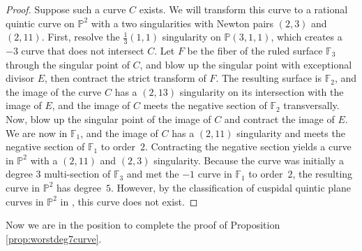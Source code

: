 \documentclass[JEP,XML,SOM,Unicode,NoFloatCountersInSection,published]{cedram}
\theoremstyle{plain}
\theoremstyle{definition}
\newcommand\FF{{\mathbb F}}
\newcommand\PP{{\mathbb{P}}}
\begin{document}
\begin{proof}
Suppose such a curve $C$ exists. We will transform this curve to a rational quintic curve on $\PP^2$ with a two singularities with Newton pairs $(2,3)$ and $(2,11)$. First, resolve the $\frac{1}{3}(1,1)$ singularity on $\PP(3,1,1)$, which creates a $-3$ curve that does not intersect $C$. Let $F$ be the fiber of the ruled surface $\FF_3$ through the singular point of $C$, and blow up the singular point with exceptional divisor $E$, then contract the strict transform of $F$. The resulting surface is $\FF_2$, and the image of the curve $C$ has a $(2,13)$ singularity on its intersection with the image of $E$, and the image of $C$ meets the negative section of $\FF_2$ transversally. Now, blow up the singular point of the image of $C$ and contract the image of $E$. We are now in $\FF_1$, and the image of $C$ has a $(2,11)$ singularity and meets the negative section of $\FF_1$ to order~$2$. Contracting the negative section yields a curve in $\PP^2$ with a $(2,11)$ and $(2,3)$ singularity. Because the curve was initially a degree 3 multi-section of $\FF_3$ and met the $-1$ curve in $\FF_1$ to order~$2$, the resulting curve in $\PP^2$ has degree~$5$. However, by the classification of cuspidal quintic plane curves in $\PP^2$ in \cite[6.1.3]{MoeThesis}, this curve does not exist.
\end{proof}

Now we are in the position to complete the proof of Proposition \ref{prop:worstdeg7curve}.
\end{document}
